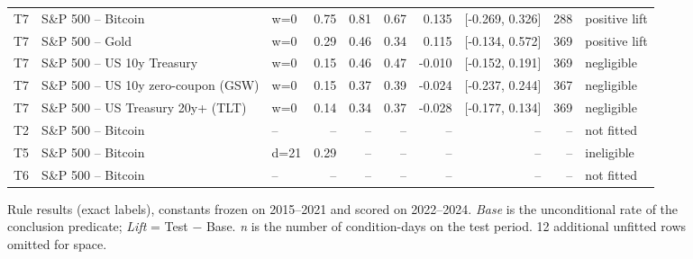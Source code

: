 \begin{figure}[t]
{\begin{tabular}{lllrrrrrrl}
T7 & S\&P 500 -- Bitcoin & w=0 & 0.75 & 0.81 & 0.67 & 0.135 & [-0.269, 0.326] & 288 & positive lift \\
T7 & S\&P 500 -- Gold & w=0 & 0.29 & 0.46 & 0.34 & 0.115 & [-0.134, 0.572] & 369 & positive lift \\
T7 & S\&P 500 -- US 10y Treasury & w=0 & 0.15 & 0.46 & 0.47 & -0.010 & [-0.152, 0.191] & 369 & negligible \\
T7 & S\&P 500 -- US 10y zero-coupon (GSW) & w=0 & 0.15 & 0.37 & 0.39 & -0.024 & [-0.237, 0.244] & 367 & negligible \\
T7 & S\&P 500 -- US Treasury 20y+ (TLT) & w=0 & 0.14 & 0.34 & 0.37 & -0.028 & [-0.177, 0.134] & 369 & negligible \\
T2 & S\&P 500 -- Bitcoin & -- & -- & -- & -- & -- & -- & -- & not fitted \\
T5 & S\&P 500 -- Bitcoin & d=21 & 0.29 & -- & -- & -- & -- & -- & ineligible \\
T6 & S\&P 500 -- Bitcoin & -- & -- & -- & -- & -- & -- & -- & not fitted \\
\bottomrule
\end{tabular}
}
\caption{Rule results (exact labels), constants frozen on 2015--2021 and scored on 2022--2024. \emph{Base} is the unconditional rate of the conclusion predicate; \emph{Lift} = Test $-$ Base. \emph{n} is the number of condition-days on the test period. 12 additional unfitted rows omitted for space.}
\label{tab:rule-results-pub}
\end{figure}
